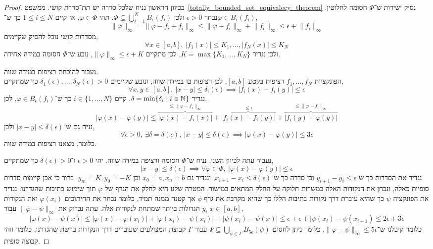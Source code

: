\begin{proof}
	בכיוון הראשון נניח שלכל סדרה יש תת־סדרת קושי.
	ממשפט\ \ref{totally_bounded_set_equivalecy_theorem} נסיק ישירות ש־$\Phi$ חסומה לחלוטין.
	נבחר $\epsilon > 0$ ולכן $\Phi \subseteq \bigcup_{i = 1}^N B_\epsilon(f_i)$.
	תהי $\varphi \in \Phi$, אז קיים $1 \le i \le N$ כך ש־$\varphi \in B_\epsilon(f_i)$,
	\[
		\lVert \varphi \rVert_\infty
		= \lVert \varphi - f_i + f_i \rVert_\infty
		\le \lVert \varphi - f_i \rVert_\infty + \lVert f_i \rVert_\infty
		\le \epsilon + \lVert f_i \rVert_\infty
	\]
	מסדרות קושי נוכל להסיק שקיימים,
	\[
		\forall x \in [a, b],\ |f_1(x)| \le K_1, \dots, |f_N(x)| \le K_N
	\]
	ולכן נגדיר $K = \max\{ K_1, \dots, K_N \}$, לכן מתקיים $\lVert \varphi \rVert_\infty \le \epsilon + K$, נובע ש־$\Phi$ חסומה במידה אחידה.

	נעבור להוכחת רציפות במידה שווה. \\
	הפונקציות $f_1, \dots, f_N$ רציפות בקטע $[a, b]$, לכן רציפות בו במידה שווה, ונובע שקיימים $\delta_1(\epsilon), \ldots, \delta_N(\epsilon) > 0$ כך שמתקיים,
	\[
		\forall x, y \in [a, b],\ 
		|x - y| \le \delta_i(\epsilon)
		\implies |f_i(x) - f_i(y)| \le \epsilon
	\]
	נגדיר $\delta = \min\{ \delta_i \mid i \in \mathbb{N} \}$.
	קיים $i \in \{1, \ldots, N\}$ כך ש־$\varphi \in B_\epsilon(f_i)$, לכן,
	\[
		|\varphi(x) - \varphi(y)|
		\le \overbrace{|\varphi(x) - f_i(x)|}^{\le \lVert \varphi - f_i\rVert_\infty} + \overbrace{|f_i(x) - f_i(y)|}^{\le \epsilon} + \overbrace{|f_i(y) - \varphi(y)|}^{\le \lVert \varphi - f_i\rVert_\infty}
	\]
	נניח גם ש־$|x - y| \le \delta(\epsilon)$ ולכן,
	\[
		\forall \epsilon > 0,\ \exists \delta = \delta(\epsilon),\ |x - y| \le \delta(\epsilon)
		\implies |\varphi(x) - \varphi(y)| \le 3 \epsilon
	\]
	כלומר, מצאנו רציפות במידה שווה.

	נעבור עתה לכיוון השני, נניח ש־$\Phi$ חסומה ורציפה במידה שווה.
	יהי $\epsilon > 0$ ו־$\delta(\epsilon) > 0$ כך שמתקיים,
	\[
		|x - y| \le \delta(\epsilon)
		\implies \forall \varphi \in \Phi,\ |\varphi(x) - \varphi(y)| \le \epsilon
	\]
	נגדיר את הסדרות כך ש־$y_{i + 1} - y_i \le \epsilon$ וכן סדרה כך ש־$x_{i + 1} - x_i \le \delta(\epsilon)$, ונגדיר גם $x_0 = a, x_n = b$ וכן $y_m = K, y_0 = -K$.
	ברור כי אכן קיימות סדרות סופיות כאלה, ונבחן את הנקודות האלה כמשרות חלוקה על החלק המתאים במישור.
	המטרה שלנו היא לחלק את הגרף של $\varphi$ תוך שימוש בתיבות שהגדרנו.
	נגדיר את הפונקציה $\psi$ כך שהיא עוברת דרך נקודות בתיבות הללו כך שהיא מקרבת את גרף $\phi$ אך קטנה ממנה תמיד, כלומר נבחר את החיתוכים $\varphi(x_i)$ ואת הנקודות $y_i$ הגדולות ביותר שמתחת לנקודות אלה.
	עתה נבדוק את $\lVert \varphi - \psi \rVert_\infty$ עבור $x \in [a, b]$,
	\[
		|\varphi(x) - \psi(x)|
		\le |\varphi(x) - \varphi(x_i)| + |\varphi(x_i) - \psi(x_i)| + |\psi(x_i) - \psi(x)|
		\le \epsilon + \epsilon + |\psi(x_i) - \psi(x_{i + 1})
		\le 2 \epsilon + 3 \epsilon
	\]
	כלומר קיבלנו ש־$\lVert \varphi - \psi \rVert_\infty \le 5 \epsilon$, כלומר ניתן לחסום $\Psi \subseteq \bigcup_{\psi \in \Gamma} B_{5 \epsilon}(\psi)$ עבור $\Gamma$ קבוצת המצולעים שעוברים דרך הנקודות ברשת שהגדרנו,
	כלומר זוהי קבוצה סופית.
\end{proof}
